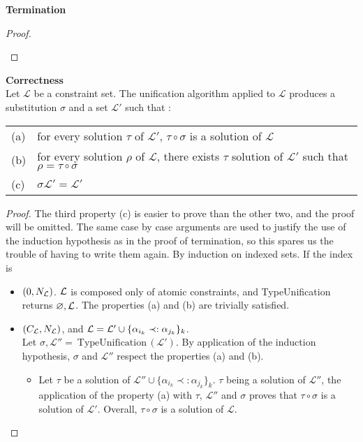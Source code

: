\begin{thm}{\bf Termination}
\begin{proof}
\begin{itemize}
		\end{itemize}
	\end{proof}
\end{thm}

\begin{thm}{\bf Correctness} \\
	Let $\mathcal{L}$ be a constraint set. The unification algorithm applied to $\mathcal{L}$ produces
	a substitution $\sigma$ and a set $\mathcal{L'}$ such that :
		\begin{center}
		\begin{tabular}{ll}
			(a) & for every solution $\tau$ of $\mathcal{L'}$, $\tau \circ \sigma$ is a solution of $\mathcal{L}$ \\
			(b) & for every solution $\rho$ of $\mathcal{L}$, there exists $\tau$ solution of $\mathcal{L'}$ such that $\rho = \tau \circ \sigma$ \\
			(c) & $\sigma \mathcal{L'} = \mathcal{L'}$
		\end{tabular}
		\end{center}

	\begin{proof}
		The third property (c) is easier to prove than the other two, and the proof will be omitted. The same case by case arguments are
		used to justify the use of the induction hypothesis as in the proof of termination, so this spares us the trouble of having to write
		them again. By induction on indexed sets. If the index is
		\begin{itemize}
			\item $(0, N_{\mathcal{L}})$. $\mathcal{L}$ is composed only of atomic constraints, and TypeUnification returns $\varnothing, \mathcal{L}$.
				The properties (a) and (b) are trivially satisfied.
				
			\item $(C_{\mathcal{L}}, N_{\mathcal{L}})$, and $\mathcal{L} = \mathcal{L}' \cup \{ \alpha_{i_k} \prec: \alpha_{j_k} \}_k$. \\
				Let $\sigma, \mathcal{L''} = ~\text{TypeUnification}\,(\mathcal{L'})$. By application of the induction hypothesis, $\sigma$ and
				$\mathcal{L''}$ respect the properties (a) and (b).
					\begin{itemize}
						\item[(a)] Let $\tau$ be a solution of $\mathcal{L''} \cup \{ \alpha_{i_k} \prec: \alpha_{j_k} \}_k$.
							$\tau$ being a solution of $\mathcal{L''}$, the application of the property (a) with $\tau$, $\mathcal{L''}$ and
							$\sigma$ proves that $\tau \circ \sigma$ is a solution of $\mathcal{L'}$. Overall, $\tau \circ \sigma$ is a
							solution of $\mathcal{L}$.
							

\end{itemize}
\end{itemize}
\end{proof}
\end{thm}
